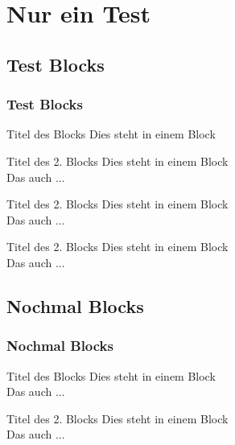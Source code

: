 \documentclass[ignorenonframetext]{beamer}
\begin{document}
\section{Nur ein Test}


\subsection{Test Blocks}

\begin{frame}
    \frametitle{Test Blocks}
    
    \begin{alert}{Titel des Blocks}
        Dies steht in einem Block
    \end{alert}
    
    \begin{example}{Titel des 2. Blocks}
        Dies steht in einem Block\\ Das auch ...
    \end{example}
    
    \begin{block}{Titel des 2. Blocks}
        Dies steht in einem Block\\ Das auch ...
    \end{block}
  
    \begin{framed}
        \begin{block}{Titel des 2. Blocks}
            Dies steht in einem Block\\ Das auch ...
        \end{block}
    \end{framed}
\end{frame}


\subsection{Nochmal Blocks}

\begin{frame}
    \frametitle{Nochmal Blocks}
    
    \begin{block}{Titel des Blocks}
        Dies steht in einem Block\\ Das auch ...
    \end{block}
    \begin{block}{Titel des 2. Blocks}
        Dies steht in einem Block\\ Das auch ...
    \end{block}
\end{frame}
\end{document}
